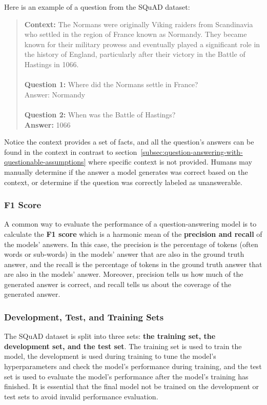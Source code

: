 \documentclass[letterpaper, 11pt]{article}
\begin{document}
\noindent
Here is an example of a question from the SQuAD dataset:
\begin{quotation}
    \noindent
    \textbf{Context:}
    The Normans were originally Viking raiders from Scandinavia who settled in the region of France known as Normandy. They became known for their military prowess and eventually played a significant role in the history of England, particularly after their victory in the Battle of Hastings in 1066.
    \\
    \\
    \textbf{Question 1:} Where did the Normans settle in France?
    \\
    Answer: Normandy
    \\
    \\
    \textbf{Question 2:} When was the Battle of Hastings?
    \\
    \textbf{Answer:} 1066
\end{quotation}


\noindent Notice the context provides a set of facts, and all the question's answers can be found in the context in contrast to section~\ref{subsec:question-answering-with-questionable-assumptions} where specific context is not provided.
Humans may manually determine if the answer a model generates was correct based on the context, or determine if the question was correctly labeled as unanswerable.


\subsubsection{F1 Score}
\label{sec:f1-score}
A common way to evaluate the performance of a question-answering model is to calculate the \textbf{F1 score} which is a harmonic mean of the \textbf{precision and recall} of the models' answers.
In this case, the precision is the percentage of tokens (often words or sub-words) in the models' answer that are also in the ground truth answer, and the recall is the percentage of tokens in the ground truth answer that are also in the models' answer.
Moreover, precision tells us how much of the generated answer is correct, and recall tells us about the coverage of the generated answer.

\subsubsection{Development, Test, and Training Sets}
\label{sec:development-test-training-sets}
The SQuAD dataset is split into three sets: \textbf{the training set, the development set, and the test set}. The training set is used to train the model, the development is used during training to tune the model's hyperparameters and check the model's performance during training, and the test set is used to evaluate the model's performance after the model's training has finished.
It is essential that the final model not be trained on the development or test sets to avoid invalid performance evaluation.
\end{document}
